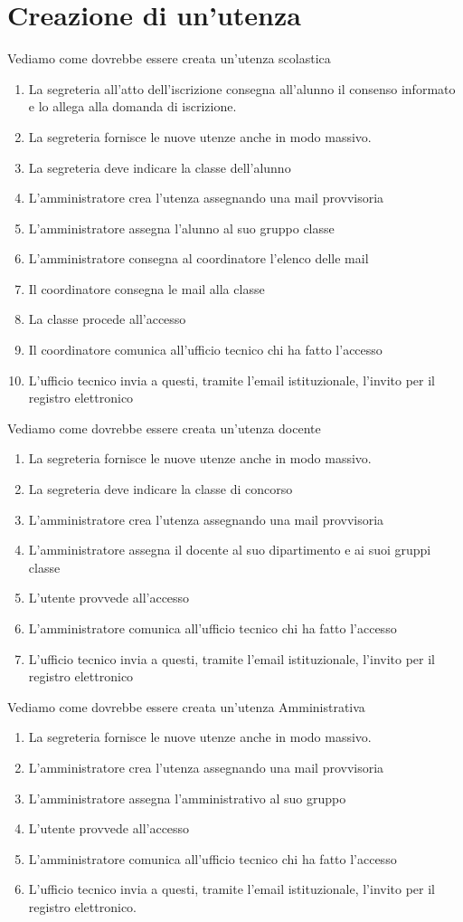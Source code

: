 \section{Creazione di un'utenza}
Vediamo come dovrebbe essere creata un'utenza scolastica
\begin{enumerate}
	\item La segreteria all'atto dell'iscrizione consegna all'alunno il consenso
	informato e lo allega alla domanda di iscrizione.
	\item La segreteria fornisce le nuove utenze anche in modo massivo.
	\item La segreteria deve indicare la classe dell'alunno
	\item L'amministratore crea l'utenza assegnando una mail provvisoria
	\item L'amministratore assegna l'alunno al suo gruppo classe
	\item L'amministratore consegna al coordinatore l'elenco delle mail
	\item Il coordinatore  consegna le mail alla classe 
	\item La classe procede all'accesso
	\item Il coordinatore comunica all'ufficio tecnico chi ha fatto l'accesso
	\item L'ufficio tecnico invia  a questi, tramite l'email istituzionale, 
	l'invito  per il registro elettronico
\end{enumerate}
Vediamo come dovrebbe essere creata un'utenza docente
\begin{enumerate}
	\item La segreteria fornisce le nuove utenze anche in modo massivo.
	\item La segreteria deve indicare la classe di concorso
	\item L'amministratore crea l'utenza assegnando una mail provvisoria
	\item L'amministratore assegna il docente al suo dipartimento e ai suoi 
	gruppi  classe
	\item L'utente provvede all'accesso
	\item L'amministratore  comunica all'ufficio tecnico chi ha fatto l'accesso
	\item L'ufficio tecnico invia  a questi, tramite l'email istituzionale, 
	l'invito  per il registro elettronico
\end{enumerate}
Vediamo come dovrebbe essere creata un'utenza Amministrativa
\begin{enumerate}
	\item La segreteria fornisce le nuove utenze anche in modo massivo.
	\item L'amministratore crea l'utenza assegnando una mail provvisoria
	\item L'amministratore assegna l'amministrativo al suo gruppo
	\item L'utente provvede all'accesso
	\item L'amministratore  comunica all'ufficio tecnico chi ha fatto l'accesso
	\item L'ufficio tecnico invia  a questi, tramite l'email istituzionale, 
	l'invito  per il registro elettronico.
\end{enumerate}
